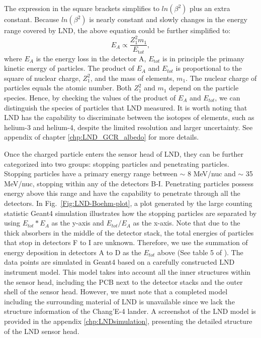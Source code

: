 The expression in the square brackets simplifies to $ln(\beta^2)$ plus an extra constant. Because $ln(\beta^2)$ is nearly constant and slowly changes in the energy range covered by \ac{LND}, the above equation could be further simplified to:
\begin{equation}
    E_A \propto \frac{Z_1^2 m_1}{E_{\mathrm tot}},
    \label{eq:BB2}
\end{equation}
where $E_A$ is the energy loss in the detector A, $E_{\mathrm tot}$ is in principle the primany kinetic energy of particles.
The product of $E_A$ and $E_{tot}$ is proportional to the square of nuclear charge, $Z_1^2$, and the mass of elements, $m_1$. The nuclear charge of particles equals the atomic number. Both $Z_1^2$ and $m_1$ depend on the particle species. Hence, by checking the values of the product of $E_A$ and $E_{tot}$, we can distinguish the species of particles that \ac{LND} measured. It is worth noting that \ac{LND} has the capability to discriminate between the isotopes of elements, such as helium-3 and helium-4, despite the limited resolution and larger uncertainty. See appendix of chapter \ref{chp:LND_GCR_albedo} for more details.



Once the charged particle enters the sensor head of \ac{LND}, they can be further categorized into two groups: stopping particles and penetrating particles. Stopping particles have a primary energy range between $\sim$ 8 MeV/nuc and $\sim$ 35 MeV/nuc, stopping within any of the detectors B-I. Penetrating particles possess energy above this range and have the capability to penetrate through all the detectors. In Fig.~\ref{Fig:LND-Boehm-plot}, a plot generated by the large counting statistic \ac{Geant4} \citep{Agostinelli-2003} simulation illustrates how the stopping particles are separated by using $E_{tot} * E_A$ as the y-axis and $E_{tot} / E_A$ as the x-axis. 
Note that due to the thick absorbers in the middle of the detector stack, the total energies of particles that stop in detectors F to I are unknown. Therefore, we use the summation of energy deposition in detectors A to D as the $E_{tot}$ above (See table 5 of \citet{Wimmer2020SSRv}).
The data points are simulated in \ac{Geant4} based on a carefully constructed \ac{LND} instrument model. This model takes into account all the inner structures within the sensor head, including the \ac{PCB} next to the detector stacks and the outer shell of the sensor head. However, we must note that a completed model including the surrounding material of \ac{LND} is unavailable since we lack the structure information of the Chang'E-4 lander.
A screenshot of the \ac{LND} model is provided in the appendix \ref{chp:LNDsimulation}, presenting the detailed structure of the \ac{LND} sensor head.


